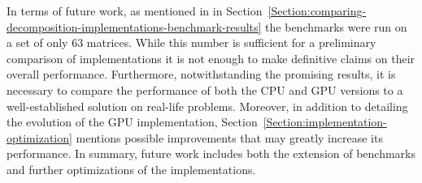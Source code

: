\par In terms of future work, as mentioned in \textit{} in Section~\ref{Section:comparing-decomposition-implementations-benchmark-results} the benchmarks were run on a set of only $ 63 $ matrices. While this number is sufficient for a preliminary comparison of implementations it is not enough to make definitive claims on their overall performance. Furthermore, notwithstanding the promising results, it is necessary to compare the performance of both the CPU and GPU versions to a well-established solution on real-life problems. Moreover, in addition to detailing the evolution of the GPU implementation, Section~\ref{Section:implementation-optimization} \textit{} mentions possible improvements that may greatly increase its performance. In summary, future work includes both the extension of benchmarks and further optimizations of the implementations.